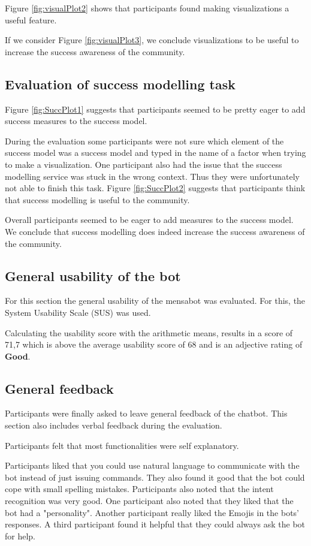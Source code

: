 

Figure \ref{fig:visualPlot2} shows that participants found making visualizations a useful feature. 



If we consider Figure \ref{fig:visualPlot3}, we conclude visualizations to be useful to increase the success awareness of the community.

\subsection{Evaluation of success modelling task}
Figure \ref{fig:SuccPlot1} suggests that participants seemed to be pretty eager to add success measures to the success model.

During the evaluation some participants were not sure which element of the success model was a success model and typed in the name of a factor when trying to make a visualization.
One participant also had the issue that the success modelling service was stuck in the wrong context. Thus they were unfortunately not able to finish this task.
Figure \ref{fig:SuccPlot2} suggests that participants think that success modelling is useful to the community.

Overall participants seemed to be eager to add measures to the success model.
We conclude that success modelling does indeed increase the success awareness of the community. 

\subsection{General usability of the bot}
For this section the general usability of the mensabot was evaluated. For this, the System Usability Scale (SUS) was used.

Calculating the usability score with the arithmetic means, results in a score of 71,7 which is above the average usability score of 68 and is an adjective rating of \textbf{Good}. 

\subsection{General feedback}
Participants were finally asked to leave general feedback of the chatbot. This section also includes verbal feedback during the evaluation. 

Participants felt that most functionalities were self explanatory. 

Participants liked that you could use natural language to communicate with the bot instead of just issuing commands.
They also found it good that the bot could cope with small spelling mistakes.
Participants also noted that the intent recognition was very good.
One participant also noted that they liked that the bot had a "personality". Another participant really liked the Emojis in the bots' responses. A third participant found it helpful that they could always ask the bot for help.

